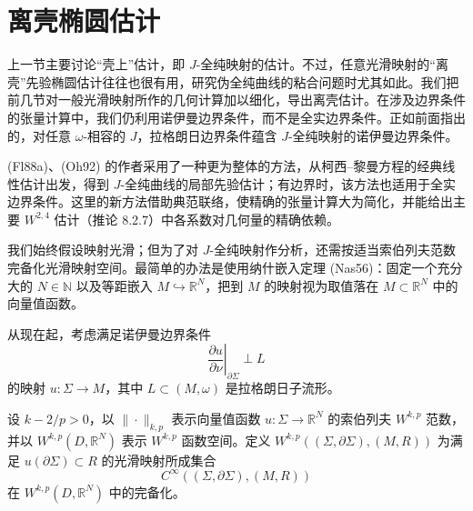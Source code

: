 \section{离壳椭圆估计}
\label{sec:off-shell-elliptic-estimates}

上一节主要讨论“壳上”估计，即 $J$-全纯映射的估计。不过，任意光滑映射的“离壳”先验椭圆估计往往也很有用，研究伪全纯曲线的粘合问题时尤其如此。我们把前几节对一般光滑映射所作的几何计算加以细化，导出离壳估计。在涉及边界条件的张量计算中，我们仍利用诺伊曼边界条件，而不是全实边界条件。正如前面指出的，对任意 $\omega$-相容的 $J$，拉格朗日边界条件蕴含 $J$-全纯映射的诺伊曼边界条件。

(Fl88a)、(Oh92) 的作者采用了一种更为整体的方法，从柯西--黎曼方程的经典线性估计出发，得到 $J$-全纯曲线的局部先验估计；有边界时，该方法也适用于全实边界条件。这里的新方法借助典范联络，使精确的张量计算大为简化，并能给出主要 $W^{2,4}$ 估计（推论 8.2.7）中各系数对几何量的精确依赖。

我们始终假设映射光滑；但为了对 $J$-全纯映射作分析，还需按适当索伯列夫范数完备化光滑映射空间。最简单的办法是使用纳什嵌入定理 (Nas56)：固定一个充分大的 $N\in\mathbb N$ 以及等距嵌入 $M\hookrightarrow\mathbb R^N$，把到 $M$ 的映射视为取值落在 $M\subset\mathbb R^N$ 中的向量值函数。

从现在起，考虑满足诺伊曼边界条件
\begin{equation}
 \left.\frac{\partial u}{\partial\nu}\right|_{\partial\Sigma}\perp L
 \label{eq:ch8-neumann-boundary-condition}
\end{equation}
的映射 $u:\Sigma\to M$，其中 $L\subset(M,\omega)$ 是拉格朗日子流形。

\begin{definition}\label{def:ch8-relative-sobolev-maps}
设 $k-2/p>0$，以 $\|\cdot\|_{k,p}$ 表示向量值函数 $u:\Sigma\to\mathbb R^N$ 的索伯列夫 $W^{k,p}$ 范数，并以 $W^{k,p}(D,\mathbb R^N)$ 表示 $W^{k,p}$ 函数空间。定义
$W^{k,p}((\Sigma,\partial\Sigma),(M,R))$ 为满足
$u(\partial\Sigma)\subset R$ 的光滑映射所成集合
\[
 C^\infty((\Sigma,\partial\Sigma),(M,R))
\]
在 $W^{k,p}(D,\mathbb R^N)$ 中的完备化。
\end{definition}

